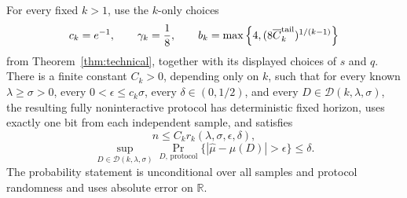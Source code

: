 \begin{corollary}\label{cor:rate}
For every fixed \(k>1\), use the \(k\)-only choices
\[
c_k=e^{-1},\qquad \gamma_k=\frac18,\qquad
b_k=\max\left\{4,
(8\overline C_k^{\rm tail})^{1/(k-1)}\right\}
\]
from Theorem~\ref{thm:technical}, together with its displayed choices of
\(s\) and \(q\).  There is a finite constant \(C_k>0\), depending only on
\(k\), such that for every known \(\lambda\geq\sigma>0\), every
\(0<\epsilon\leq c_k\sigma\), every \(\delta\in(0,1/2)\), and every
\(D\in\mathcal D(k,\lambda,\sigma)\), the resulting fully noninteractive
protocol has deterministic fixed horizon, uses exactly one bit from each
independent sample, and satisfies
\[
n\leq C_kr_k(\lambda,\sigma,\epsilon,\delta),
\]
\[
\sup_{D\in\mathcal D(k,\lambda,\sigma)}
\Pr_{D,\,\mathrm{protocol}}
\{|\widehat\mu-\mu(D)|>\epsilon\}\leq\delta.
\]
The probability statement is unconditional over all samples and protocol
randomness and uses absolute error on \(\mathbb R\).
\end{corollary}
